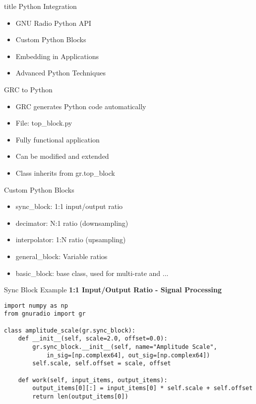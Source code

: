 \documentclass[aspectratio=169,11pt]{beamer}
\begin{document}
\begin{frame}[plain]
\vfill
\centering
\begin{beamercolorbox}[sep=8pt,center,shadow=true,rounded=true]{title}
\Large Python Integration\par
\end{beamercolorbox}
\vfill
\begin{itemize}
    \item GNU Radio Python API
    \item Custom Python Blocks
    \item Embedding in Applications
    \item Advanced Python Techniques
\end{itemize}
\vfill
\end{frame}

\begin{frame}{GRC to Python}
\begin{itemize}
    \item GRC generates Python code automatically
    \item File: top\_block.py
    \item Fully functional application
    \item Can be modified and extended
    \item Class inherits from gr.top\_block
\end{itemize}
\end{frame}

\begin{frame}{Custom Python Blocks}
\begin{itemize}
    \item sync\_block: 1:1 input/output ratio
    \item decimator: N:1 ratio (downsampling)
    \item interpolator: 1:N ratio (upsampling)
    \item general\_block: Variable ratios
    \item basic\_block: base class, used for multi-rate and ...
\end{itemize}
\end{frame}

\begin{frame}[fragile]{Sync Block Example}
\textbf{1:1 Input/Output Ratio - Signal Processing}
\tiny
\begin{verbatim}
import numpy as np
from gnuradio import gr

class amplitude_scale(gr.sync_block):
    def __init__(self, scale=2.0, offset=0.0):
        gr.sync_block.__init__(self, name="Amplitude Scale",
            in_sig=[np.complex64], out_sig=[np.complex64])
        self.scale, self.offset = scale, offset
    
    def work(self, input_items, output_items):
        output_items[0][:] = input_items[0] * self.scale + self.offset
        return len(output_items[0])
\end{verbatim}
\end{frame}
\end{document}
